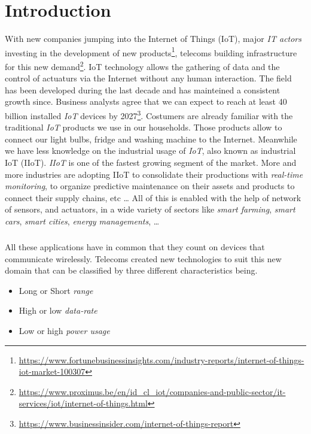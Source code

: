 \chapter{Introduction}

With new companies jumping into the Internet of Things (IoT), 
major \emph{IT actors} investing in the development of new
products\footnote{\url{https://www.fortunebusinessinsights.com/industry-reports/internet-of-things-iot-market-100307}},
 telecoms building infrastructure for this new 
demand\footnote{\url{https://www.proximus.be/en/id_cl_iot/companies-and-public-sector/it-services/iot/internet-of-things.html}}.
IoT technology allows the gathering of data and the control of actuaturs via
the Internet without any human interaction.
The field has been developed during the last decade and has mainteined a
consistent growth since.
Business analysts agree that we can expect to reach at least 40 billion
installed \emph{IoT} devices by
2027\footnote{\url{https://www.businessinsider.com/internet-of-things-report}}. 
Costumers are already familiar with the traditional \emph{IoT} products
we use in our households. Those products allow to connect our light bulbs, fridge and
washing machine to the Internet.
Meanwhile we have less knowledge on the industrial usage of \emph{IoT}, also
known as industrial IoT (IIoT). \emph{IIoT} is one of the fastest growing
segment of the market.
More and more industries are adopting IIoT to consolidate their productions
with \emph{real-time monitoring}, to organize predictive maintenance on their
assets and products to connect their supply chains, etc \ldots
All of this is enabled with
the help of network of sensors, and actuators, in a wide variety of
sectors like \emph{smart farming}, \emph{smart cars}, \emph{smart cities},
\emph{energy managements}, \ldots

\paragraph{}

All these applications have in common that they count on devices that
communicate wirelessly.
Telecoms created new technologies to suit this new domain that can be
classified by three different characteristics being.

\begin{itemize}
    \item Long or Short \emph{range}
    \item High or low \emph{data-rate}
    \item Low or high \emph{power usage} 
\end{itemize}

